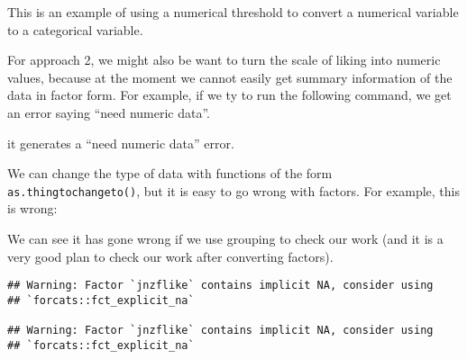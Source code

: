 \documentclass[]{article}
\newenvironment{Shaded}{\begin{snugshade}}{\end{snugshade}}
\newcommand{\KeywordTok}[1]{\textcolor[rgb]{0.13,0.29,0.53}{\textbf{#1}}}
\newcommand{\DataTypeTok}[1]{\textcolor[rgb]{0.13,0.29,0.53}{#1}}
\newcommand{\StringTok}[1]{\textcolor[rgb]{0.31,0.60,0.02}{#1}}
\newcommand{\OperatorTok}[1]{\textcolor[rgb]{0.81,0.36,0.00}{\textbf{#1}}}
\newcommand{\NormalTok}[1]{#1}
\begin{document}
This is an example of using a numerical threshold to convert a numerical
variable to a categorical variable.

For approach 2, we might also be want to turn the scale of liking into
numeric values, because at the moment we cannot easily get summary
information of the data in factor form. For example, if we ty to run the
following command, we get an error saying ``need numeric data''.

\begin{Shaded}
\end{Shaded}

it generates a ``need numeric data'' error.

We can change the type of data with functions of the form
\texttt{as.thingtochangeto()}, but it is easy to go wrong with factors.
For example, this is wrong:

\begin{Shaded}
\end{Shaded}

We can see it has gone wrong if we use grouping to check our work (and
it is a very good plan to check our work after converting factors).

\begin{Shaded}
\end{Shaded}

\begin{verbatim}
## Warning: Factor `jnzflike` contains implicit NA, consider using
## `forcats::fct_explicit_na`

## Warning: Factor `jnzflike` contains implicit NA, consider using
## `forcats::fct_explicit_na`
\end{verbatim}
\end{document}
